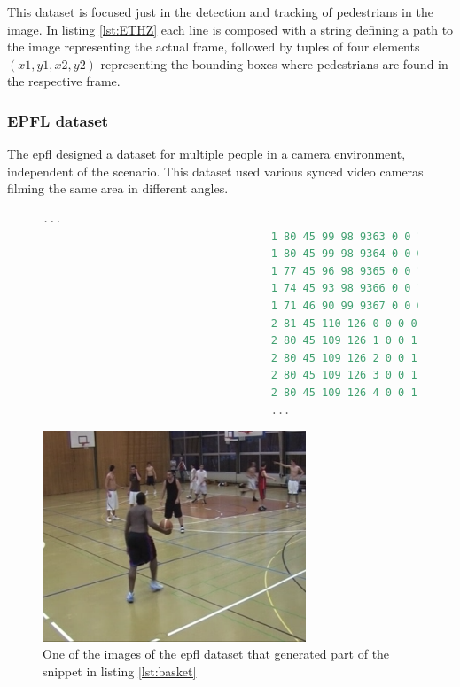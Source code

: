 This dataset is focused just in the detection and tracking of pedestrians in the image. \cite{ETHZEidgenossischeTechnischeHochschuleZurich} In listing \ref{lst:ETHZ} each line is composed with a string defining a path to the image representing the actual frame, followed by tuples of four elements $(x1,y1,x2,y2)$ representing the bounding boxes where pedestrians are found in the respective frame. 

\subsubsection{EPFL dataset}
The \gls{epfl} designed a dataset for multiple people in a camera environment, independent of the scenario. This dataset used various synced video cameras filming the same area in different angles. 

\begin{figure}
\begin{center}
	\begin{lstlisting}[label={lst:basket}, caption={ETHZ dataset file snippet.},language=c++]
									...
									1 80 45 99 98 9363 0 0 1 "PERSON"
									1 80 45 99 98 9364 0 0 0 "PERSON"
									1 77 45 96 98 9365 0 0 1 "PERSON"
									1 74 45 93 98 9366 0 0 1 "PERSON"
									1 71 46 90 99 9367 0 0 0 "PERSON"
									2 81 45 110 126 0 0 0 0 "PERSON"
									2 80 45 109 126 1 0 0 1 "PERSON"
									2 80 45 109 126 2 0 0 1 "PERSON"
									2 80 45 109 126 3 0 0 1 "PERSON"
									2 80 45 109 126 4 0 0 1 "PERSON"
									...	\end{lstlisting}
\end{center}
\end{figure}

\begin{figure}[htp]
	
	\centering
	\includegraphics[width=0.7\textwidth]{capstate/imgs/basket.png}
	
	\caption{One of the images of the \gls{epfl} dataset that generated part of the snippet in listing \ref{lst:basket} }
	\label{fig:basket}
	
\end{figure}


